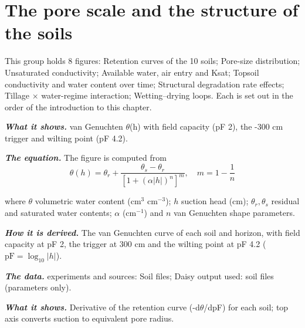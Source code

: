 \section{The pore scale and the structure of the soils}
This group holds 8 figures: Retention curves of the 10 soils; Pore-size distribution; Unsaturated conductivity; Available water, air entry and Ksat; Topsoil conductivity and water content over time; Structural degradation rate effects; Tillage $\times$ water-regime interaction; Wetting--drying loops. Each is set out in the order of the introduction to this chapter.
\par\vspace{6pt}\noindent{}\par\nobreak
{}\label{fig:a19_6}
\par\noindent\textbf{\color{khmag}\emph{What it shows.}} van Genuchten $\theta$(h) with field capacity (pF 2), the -300 cm trigger and wilting point (pF 4.2).
\par\noindent\textbf{\color{khmag}\emph{The equation.}} The figure is computed from
\begin{equation}\boxed{\theta(h)=\theta_r+\dfrac{\theta_s-\theta_r}{\left[1+(\alpha|h|)^{n}\right]^{m}},\quad m=1-\dfrac1n}\end{equation}
\par\noindent where $\theta$ volumetric water content (cm$^3$ cm$^{-3}$); $h$ suction head (cm); $\theta_r,\theta_s$ residual and saturated water contents; $\alpha$ (cm$^{-1}$) and $n$ van Genuchten shape parameters.
\par\noindent\textbf{\color{khmag}\emph{How it is derived.}} The van Genuchten curve of each soil and horizon, with field capacity at pF 2, the trigger at 300 cm and the wilting point at pF 4.2 ($\mathrm{pF}=\log_{10}|h|$).
\par\noindent\textbf{\color{khmag}\emph{The data.}} experiments and sources: Soil files; Daisy output used: soil files (parameters only).
\par\vspace{6pt}\noindent{}\par\nobreak
{}\label{fig:a19_7}
\par\noindent\textbf{\color{khmag}\emph{What it shows.}} Derivative of the retention curve (-d$\theta$/dpF) for each soil; top axis converts suction to equivalent pore radius.
